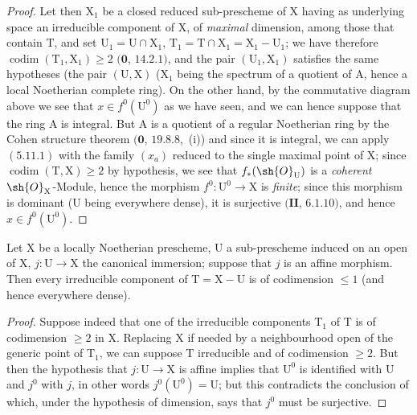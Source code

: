 \begin{proof}
Let then $\mathrm{X}_1$ be a closed reduced sub-prescheme of $\mathrm{X}$ having as underlying space an irreducible component of $\mathrm{X}$, of \emph{maximal} dimension, among those that contain $\mathrm{T}$, and set $\mathrm{U}_1=\mathrm{U}\cap\mathrm{X}_1$, $\mathrm{T}_1=\mathrm{T}\cap\mathrm{X}_1=\mathrm{X}_1-\mathrm{U}_1$; we have therefore $\operatorname{codim}(\mathrm{T}_1,\mathrm{X}_1)\geq 2$ $(\mathbf{0}$, $14.2.1)$, and the pair $(\mathrm{U}_1,\mathrm{X}_1)$ satisfies the same hypotheses (the pair $(\mathrm{U},\mathrm{X})$ ($\mathrm{X}_1$ being the spectrum of a quotient of $\mathrm{A}$, hence a local Noetherian complete ring).
On the other hand, by the commutative diagram above we see that $x\in f^0(\mathrm{U}^0)$ as we have seen, and we can hence suppose that the ring $\mathrm{A}$ is integral.
But $\mathrm{A}$ is a quotient of a regular Noetherian ring by the Cohen structure theorem $(\mathbf{0}$, $19.8.8$,~(i)) and since it is integral, we can apply $(5.11.1)$ with the family $(x_a)$ reduced to the single maximal point of $\mathrm{X}$; since $\operatorname{codim}(\mathrm{T},\mathrm{X})\geq 2$ by hypothesis, we see that $f_*(\sh{O}_{\mathrm{U}})$ is a \emph{coherent} $\sh{O}_{\mathrm{X}}$-Module, hence the morphism $f^0:\mathrm{U}^0\to\mathrm{X}$ is \emph{finite}; since this morphism is dominant ($\mathrm{U}$ being everywhere dense), it is surjective $(\mathbf{II}$, $6.1.10)$, and hence $x\in f^0(\mathrm{U}^0)$.
\end{proof}

\begin{corollary}[21.12.7]
\label{IV.21.12.7}
Let $\mathrm{X}$ be a locally Noetherian prescheme, $\mathrm{U}$ a sub-prescheme induced on an open of $\mathrm{X}$, $j:\mathrm{U}\to\mathrm{X}$ the canonical immersion; suppose that $j$ is an affine morphism.
Then every irreducible component of $\mathrm{T}=\mathrm{X}-\mathrm{U}$ is of codimension $\leq 1$ (and hence everywhere dense).
\end{corollary}

\begin{proof}
Suppose indeed that one of the irreducible components $\mathrm{T}_1$ of $\mathrm{T}$ is of codimension $\geq 2$ in $\mathrm{X}$.
Replacing $\mathrm{X}$ if needed by a neighbourhood open of the generic point of $\mathrm{T}_1$, we can suppose $\mathrm{T}$ irreducible and of codimension $\geq 2$.
But then the hypothesis
that $j:\mathrm{U}\to\mathrm{X}$ is affine implies that $\mathrm{U}^0$ is identified with $\mathrm{U}$ and $j^0$ with $j$, in other words $j^0(\mathrm{U}^0)=\mathrm{U}$; but this contradicts the conclusion of  which, under the hypothesis of dimension, says that $j^0$ must be surjective.
\end{proof}

